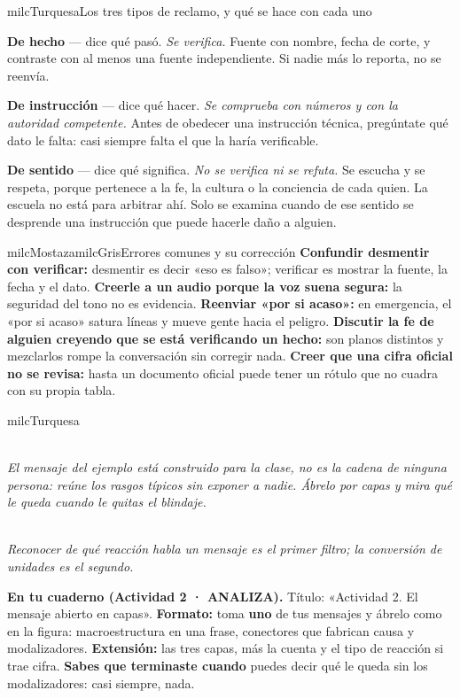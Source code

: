 \documentclass[11pt,letterpaper]{article}
\newcommand{\guiaDiagrama}[2]{%
\begin{center}
\\[1.5mm]
{\footnotesize\itshape\textcolor{milcNegro!75}{#2}}
\end{center}
}
\begin{document}
\begin{drawbox}{milcTurquesa}{Los tres tipos de reclamo, y qué se hace con cada uno}
\begin{pasoslista}
\item \textbf{De hecho} — dice qué pasó. \emph{Se verifica.} Fuente con nombre, fecha de corte, y contraste con al menos una fuente independiente. Si nadie más lo reporta, no se reenvía.
\item \textbf{De instrucción} — dice qué hacer. \emph{Se comprueba con números y con la autoridad competente.} Antes de obedecer una instrucción técnica, pregúntate qué dato le falta: casi siempre falta el que la haría verificable.
\item \textbf{De sentido} — dice qué significa. \emph{No se verifica ni se refuta.} Se escucha y se respeta, porque pertenece a la fe, la cultura o la conciencia de cada quien. La escuela no está para arbitrar ahí. Solo se examina cuando de ese sentido se desprende una instrucción que puede hacerle daño a alguien.
\end{pasoslista}
\end{drawbox}

\begin{softbox}{milcMostaza}{milcGris}{Errores comunes y su corrección}
\textbf{Confundir desmentir con verificar:} desmentir es decir «eso es falso»; verificar es mostrar la fuente, la fecha y el dato. \textbf{Creerle a un audio porque la voz suena segura:} la seguridad del tono no es evidencia. \textbf{Reenviar «por si acaso»:} en emergencia, el «por si acaso» satura líneas y mueve gente hacia el peligro. \textbf{Discutir la fe de alguien creyendo que se está verificando un hecho:} son planos distintos y mezclarlos rompe la conversación sin corregir nada. \textbf{Creer que una cifra oficial no se revisa:} hasta un documento oficial puede tener un rótulo que no cuadra con su propia tabla.
\end{softbox}

\begin{infoband}{milcTurquesa}
\guiaDiagrama{assets/10-7/capas-del-rumor.tikz}{El mensaje del ejemplo está construido para la clase, no es la cadena de ninguna persona: reúne los rasgos típicos sin exponer a nadie. Ábrelo por capas y mira qué le queda cuando le quitas el blindaje.}
\guiaDiagrama{assets/10-7/tres-reacciones.tikz}{Reconocer de qué reacción habla un mensaje es el primer filtro; la conversión de unidades es el segundo.}

\textbf{En tu cuaderno (Actividad 2 · ANALIZA).} Título: «Actividad 2. El mensaje abierto en capas». \textbf{Formato:} toma \textbf{uno} de tus mensajes y ábrelo como en la figura: macroestructura en una frase, conectores que fabrican causa y modalizadores. \textbf{Extensión:} las tres capas, más la cuenta y el tipo de reacción si trae cifra. \textbf{Sabes que terminaste cuando} puedes decir qué le queda sin los modalizadores: casi siempre, nada.
\end{infoband}
\end{document}

